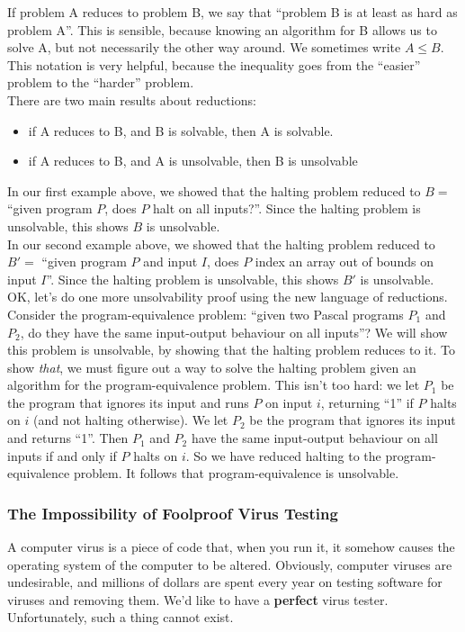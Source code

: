 \documentclass[12pt]{article}
\theoremstyle{plain}
\theoremstyle{definition}
\begin{document}
If problem A reduces to problem B, we say that ``problem B is at least as hard as problem A''.
This is sensible, because knowing an algorithm for B allows us to solve A, but not necessarily the other way around.
We sometimes write $A \leq B$. This notation is very helpful, because the inequality goes from the ``easier'' problem to the ``harder'' problem. \\

There are two main results about reductions:
\begin{itemize}
  \item if A reduces to B, and B is solvable, then A is solvable.
  \item if A reduces to B, and A is unsolvable, then B is unsolvable
\end{itemize}

In our first example above, we showed that the halting problem reduced to $B =$ ``given program $P$, does $P$ halt on all inputs?''.
Since the halting problem is unsolvable, this shows $B$ is unsolvable. \\

In our second example above, we showed that the halting problem reduced to $B' =$ ``given program $P$ and input $I$, does $P$ index an array out of bounds on input $I$''. Since the halting problem is unsolvable, this shows $B'$ is unsolvable. \\

OK, let's do one more unsolvability proof using the new language of reductions. \\
Consider the program-equivalence problem: ``given two Pascal programs $P_{1}$ and $P_{2}$, do they have the same input-output behaviour on all inputs''?
We will show this problem is unsolvable, by showing that the halting problem reduces to it.
To show \emph{that}, we must figure out a way to solve the halting problem given an algorithm for the program-equivalence problem.
This isn't too hard: we let $P_{1}$ be the program that ignores its input and runs $P$ on input $i$, returning ``1'' if $P$ halts on $i$ (and not halting otherwise).
We let $P_{2}$ be the program that ignores its input and returns ``1''.
Then $P_{1}$ and $P_{2}$ have the same input-output behaviour on all inputs if and only if $P$ halts on $i$.
So we have reduced halting to the program-equivalence problem.
It follows that program-equivalence is unsolvable.

\subsubsection{The Impossibility of Foolproof Virus Testing}
A computer virus is a piece of code that, when you run it, it somehow causes the operating system of the computer to be altered.
Obviously, computer viruses are undesirable, and millions of dollars are spent every year on testing software for viruses and removing them.
We'd like to have a \textbf{perfect} virus tester.
Unfortunately, such a thing cannot exist. \\
\end{document}

